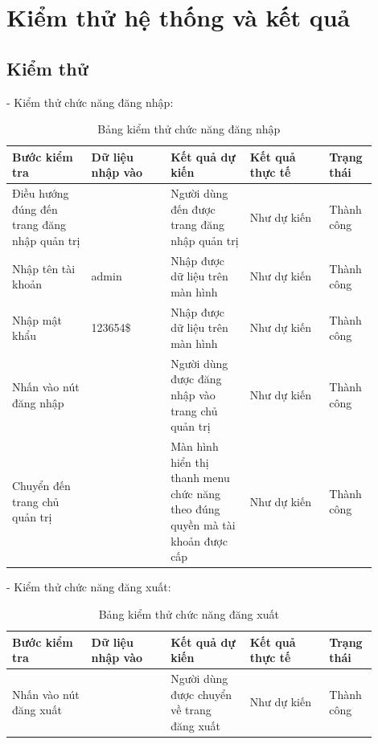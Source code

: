 \section{Kiểm thử hệ thống và kết quả}
\subsection{Kiểm thử}
- Kiểm thử chức năng đăng nhập:
\begin{longtable}[htp]{ |m{0.2\linewidth}|m{0.2\linewidth}|m{0.2\linewidth}|m{0.2\linewidth}|m{0.1\linewidth}|}
 \caption{Bảng kiểm thử chức năng đăng nhập \label{updateProduct}}\\
 \hline
Bước kiểm tra & Dữ liệu nhập vào & Kết quả dự kiến & Kết quả thực tế & Trạng thái \\
 \hline
Điều hướng đúng đến trang đăng nhập quản trị & &Người dùng đến được trang đăng nhập quản trị & Như dự kiến & Thành công\\
 \hline
 Nhập tên tài khoản & admin & Nhập được dữ liệu trên màn hình & Như dự kiến & Thành công\\
 \hline
  Nhập mật khẩu & 123654\$ & Nhập được dữ liệu trên màn hình & Như dự kiến & Thành công\\
 \hline
  Nhấn vào nút đăng nhập & & Người dùng được đăng nhập vào trang chủ quản trị & Như dự kiến & Thành công\\
 \hline
  Chuyển đến trang chủ quản trị & & Màn hình hiển thị thanh menu chức năng theo đúng quyền mà tài khoản được cấp & Như dự kiến & Thành công\\
 \hline
\end{longtable}

- Kiểm thử chức năng đăng xuất:
\begin{longtable}[htp]{ |m{0.2\linewidth}|m{0.2\linewidth}|m{0.2\linewidth}|m{0.2\linewidth}|m{0.1\linewidth}|}
 \caption{Bảng kiểm thử chức năng đăng xuất \label{updateProduct}}\\
 \hline
 Bước kiểm tra & Dữ liệu nhập vào & Kết quả dự kiến & Kết quả thực tế & Trạng thái \\
 \hline
  Nhấn vào nút đăng xuất & & Người dùng được chuyển về trang đăng xuất & Như dự kiến & Thành công\\
 \hline
\end{longtable}

